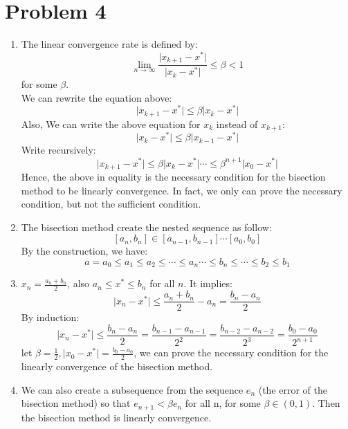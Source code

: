 \documentclass[11pt]{article}
\newcommand{\1}{\mathbbm{1}}
\begin{document}
\section*{Problem 4}
\begin{enumerate}
	\item The linear convergence rate is defined by:
	$$\lim_{n \to\infty} \frac{\vert x_{k+1}-x^{*} \vert}{\vert x_{k}-x^{*} \vert} \leq \beta < 1$$ for some $\beta$.\\
	We can rewrite the equation above:
	$$
	\vert x_{k+1}-x^{*}\vert  \leq \beta \vert x_{k}-x^{*} \vert
	$$
	Also, We can write the above equation for $x_k$ instead of $x_{k+1}$:
	$$\vert x_{k}-x^{*} \vert \leq \beta \vert x_{k-1}-x^{*} \vert
	$$
	Write recursively:
	$$\vert x_{k+1}-x^{*}\vert  \leq \beta \vert x_{k}-x^{*} \vert \cdots \leq \beta^{n+1} \vert x_{0}-x^{*}\vert$$
	Hence, the above in equality is the necessary condition for the bisection method to be linearly convergence. In fact, we only can prove the necessary condition, but not the sufficient condition.
	\item The bisection method create the nested sequence as follow:
	$$[a_n,b_n]\in [a_{n-1},b_{n-1}] \cdots [a_0,b_0]$$
	By the construction, we have:
	$$a=a_0\leq a_1 \leq a_2 \leq  \cdots \leq a_n \cdots  \leq  b_n \leq \cdots \leq b_2 \leq b_1$$
	\item $x_n = \frac{a_n+b_n}{2}$, also $a_n \leq x^* \leq b_n$ for all $n$.
	It implies:
	$$\vert x_n -x^* \vert \leq \frac{a_n+b_n}{2} - a_n  = \frac{b_n-a_n}{2}$$
	By induction: \\
	
	$$\vert x_n -x^* \vert  \leq \frac{b_n - a_n}{2} =  \frac{b_{n-1} - a_{n-1} }{2^2} =  \frac{b_{n-2} - a_{n-2} }{2^3} =  \frac{b_0 - a_0 }{2^{n+1}}$$
	let $\beta = \frac{1}{2}, $$\vert x_0 -x^* \vert  = \frac{b_0-a_0}{2}$, we can prove the necessary condition for the linearly convergence of the bisection method.\\
	\item We can also create a subsequence from the sequence $e_n$ (the error of the bisection method) so that $e_{n+1} < \beta e_n$ for all n, for some $\beta \in (0,1)$. Then the bisection method is linearly convergence.
\end{enumerate}
\end{document}
